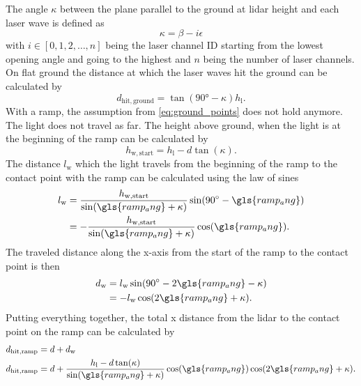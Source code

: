 The angle $\kappa$ between the plane parallel to the ground at \gls{lidar} height and each laser wave is defined as
\begin{equation}
    \kappa = \beta - i\epsilon
\end{equation}
with $i \in [0,1,2,\dots,n]$ being the laser channel ID starting from the lowest opening angle and going to the highest and $n$ being the number of laser channels.
On flat ground the distance at which the laser waves hit the ground can be calculated by
\begin{equation}
    d_\mathrm{hit,ground}  = \tan(\ang{90} - \kappa) h_\mathrm{l}.
    \label{eq:ground_points}
\end{equation}
With a ramp, the assumption from \cref{eq:ground_points} does not hold anymore.
The light does not travel as far.
The height above ground, when the light is at the beginning of the ramp can be calculated by
\begin{equation}
    h_\mathrm{w,start} = h_\mathrm{l} - d\tan(\kappa).
\end{equation}
The distance $l_\mathrm{w}$ which the light travels from the beginning of the ramp to the contact point with the ramp can be calculated using the law of sines
\begin{align}
    l_\mathrm{w} & = \frac{h_\mathrm{w,start} }{\sin(\gls{ramp_ang} + \kappa)} \sin(\ang{90} - \gls{ramp_ang}) \nonumber \\
                 & = -\frac{h_\mathrm{w,start} }{\sin(\gls{ramp_ang} + \kappa)} \cos(\gls{ramp_ang}).
\end{align}
The traveled distance along the x-axis from the start of the ramp to the contact point is then
\begin{align}
    d_\mathrm{w} & = l_\mathrm{w} \sin(\ang{90} - 2\gls{ramp_ang} - \kappa) \nonumber \\
                 & = -l_\mathrm{w} \cos(2\gls{ramp_ang} + \kappa).
\end{align}
Putting everything together, the total x distance from the \gls{lidar} to the contact point on the ramp can be calculated by
\begin{align}
    d_\mathrm{hit,ramp} & = d + d_\mathrm{w}                                                                                    \nonumber               \\
    d_\mathrm{hit,ramp} & = d + \frac{h_\mathrm{l} - d\tan(\kappa)}{\sin(\gls{ramp_ang} + \kappa)} \cos(\gls{ramp_ang}) \cos(2\gls{ramp_ang} + \kappa).
    \label{eq:final_equation}
\end{align}
